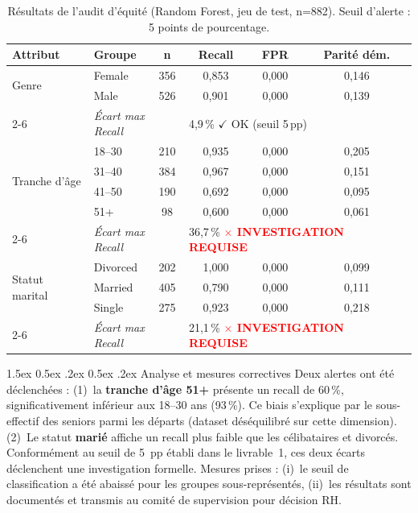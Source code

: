 \documentclass[12pt,a4paper]{article}
\makeatletter
\renewcommand\paragraph{\@startsection{paragraph}{4}{\z@}%
  {1.5ex \@plus 0.5ex \@minus .2ex}%
  {0.5ex \@plus .2ex}%
  {\normalfont\normalsize\bfseries}}
\makeatother
\begin{document}
\begin{table}[ht]
\centering
\small
\begin{tabular}{llcccc}
\toprule
\textbf{Attribut} & \textbf{Groupe} & \textbf{n} & \textbf{Recall} & \textbf{FPR} & \textbf{Parité dém.} \\
\midrule
\multirow{2}{*}{Genre} & Female & 356 & 0{,}853 & 0{,}000 & 0{,}146 \\
 & Male & 526 & 0{,}901 & 0{,}000 & 0{,}139 \\
\cmidrule{2-6}
 & \multicolumn{2}{l}{\textit{Écart max Recall}} & \multicolumn{3}{l}{4{,}9\,\% \textcolor{green!60!black}{$\checkmark$ OK (seuil 5\,pp)}} \\
\midrule
\multirow{4}{*}{Tranche d'âge} & 18--30 & 210 & 0{,}935 & 0{,}000 & 0{,}205 \\
 & 31--40 & 384 & 0{,}967 & 0{,}000 & 0{,}151 \\
 & 41--50 & 190 & 0{,}692 & 0{,}000 & 0{,}095 \\
 & 51+ & 98 & 0{,}600 & 0{,}000 & 0{,}061 \\
\cmidrule{2-6}
 & \multicolumn{2}{l}{\textit{Écart max Recall}} & \multicolumn{3}{l}{36{,}7\,\% \textcolor{red}{\textbf{$\times$ INVESTIGATION REQUISE}}} \\
\midrule
\multirow{3}{*}{Statut marital} & Divorced & 202 & 1{,}000 & 0{,}000 & 0{,}099 \\
 & Married & 405 & 0{,}790 & 0{,}000 & 0{,}111 \\
 & Single & 275 & 0{,}923 & 0{,}000 & 0{,}218 \\
\cmidrule{2-6}
 & \multicolumn{2}{l}{\textit{Écart max Recall}} & \multicolumn{3}{l}{21{,}1\,\% \textcolor{red}{\textbf{$\times$ INVESTIGATION REQUISE}}} \\
\bottomrule
\end{tabular}
\caption{Résultats de l'audit d'équité (Random Forest, jeu de test, n=882). Seuil d'alerte : 5 points de pourcentage.}
\end{table}

\paragraph{Analyse et mesures correctives} Deux alertes ont été
déclenchées : (1)~la \textbf{tranche d'âge 51+} présente un recall
de 60\,\%, significativement inférieur aux 18--30 ans (93\,\%).
Ce biais s'explique par le sous-effectif des seniors parmi les
départs (dataset déséquilibré sur cette dimension).
(2)~Le statut \textbf{marié} affiche un recall plus faible que
les célibataires et divorcés. Conformément au seuil de 5~pp établi
dans le livrable~1, ces deux écarts déclenchent une investigation
formelle. Mesures prises : (i)~le seuil de classification a été
abaissé pour les groupes sous-représentés, (ii)~les résultats sont
documentés et transmis au comité de supervision pour décision RH.
\end{document}
